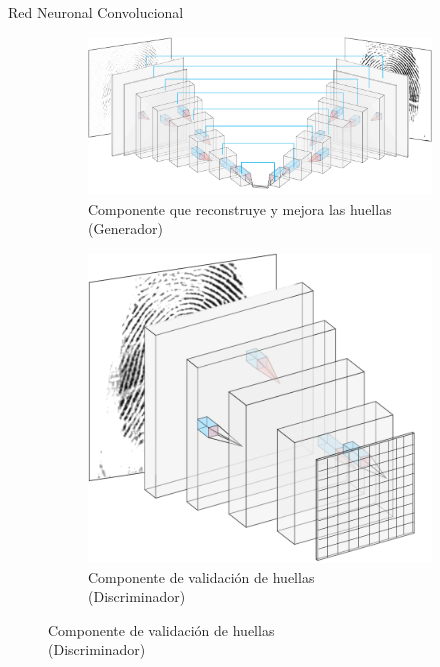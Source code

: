\documentclass[12pt,aspectratio=169]{beamer}
\begin{document}
\begin{frame}{Red Neuronal Convolucional}

   \begin{figure}
        \begin{subfigure}{0.62\textwidth}
            \centering
            \includegraphics[scale=0.34]{figs/layers_nn_u.PNG}
            \caption{Componente que reconstruye y mejora las huellas \\ (Generador)}
        \end{subfigure}
        \begin{subfigure}{0.36\textwidth}
            \centering
            \includegraphics[scale=0.25]{figs/disc_cuad.png}
            \caption{Componente de validación de huellas \\ (Discriminador)}
        \end{subfigure}
    \end{figure}

\end{frame}
\end{document}
